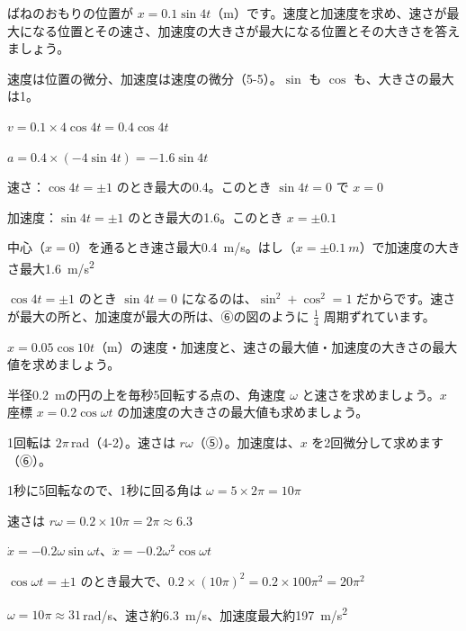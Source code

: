 \begin{reidai}[ばねのおもりの速度と加速度]
ばねのおもりの位置が $x=0.1\sin4t$（m）です。速度と加速度を求め、速さが最大になる位置とその速さ、加速度の大きさが最大になる位置とその大きさを答えましょう。\par
\kangaekata 速度は位置の微分、加速度は速度の微分（5-5）。$\sin$ も $\cos$ も、大きさの最大は1。\par
\shiki $v=0.1\times4\cos4t=0.4\cos4t$\par
\hspace*{2.6\zw}$a=0.4\times(-4\sin4t)=-1.6\sin4t$\par
\hspace*{2.6\zw}速さ：$\cos4t=\pm1$ のとき最大の0.4。このとき $\sin4t=0$ で $x=0$\par
\hspace*{2.6\zw}加速度：$\sin4t=\pm1$ のとき最大の1.6。このとき $x=\pm0.1$\par
\kotae 中心（$x=0$）を通るとき速さ最大\qty{0.4}{m/s}。はし（$x=\pm\qty{0.1}{m}$）で加速度の大きさ最大\qty{1.6}{m/s^2}
\end{reidai}
$\cos4t=\pm1$ のとき $\sin4t=0$ になるのは、$\sin^2+\cos^2=1$ だからです。速さが最大の所と、加速度が最大の所は、⑥の図のように $\frac{1}{4}$ 周期ずれています。

\begin{jibun}
$x=0.05\cos10t$（m）の速度・加速度と、速さの最大値・加速度の大きさの最大値を求めましょう。
\end{jibun}

\begin{reidai}[円運動の速さと加速度]
半径\qty{0.2}{m}の円の上を毎秒5回転する点の、角速度 $\omega$ と速さを求めましょう。$x$ 座標 $x=0.2\cos\omega t$ の加速度の大きさの最大値も求めましょう。\par
\kangaekata 1回転は $2\pi$\,rad（4-2）。速さは $r\omega$（⑤）。加速度は、$x$ を2回微分して求めます（⑥）。\par
\shiki 1秒に5回転なので、1秒に回る角は $\omega=5\times2\pi=10\pi$\par
\hspace*{2.6\zw}速さは $r\omega=0.2\times10\pi=2\pi\approx6.3$\par
\hspace*{2.6\zw}$\dot{x}=-0.2\omega\sin\omega t$、$\ddot{x}=-0.2\omega^2\cos\omega t$\par
\hspace*{2.6\zw}$\cos\omega t=\pm1$ のとき最大で、$0.2\times(10\pi)^2=0.2\times100\pi^2=20\pi^2$\par
\kotae $\omega=10\pi\approx31$\,rad/s、速さ約\qty{6.3}{m/s}、加速度最大約\qty{197}{m/s^2}
\end{reidai}

